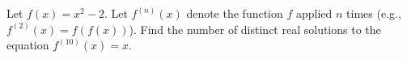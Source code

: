 Let $f(x) = x^2 - 2$. Let $f^{(n)}(x)$ denote the function $f$ applied $n$ times (e.g., $f^{(2)}(x) = f(f(x))$). Find the number of distinct real solutions to the equation $f^{(10)}(x) = x$.
